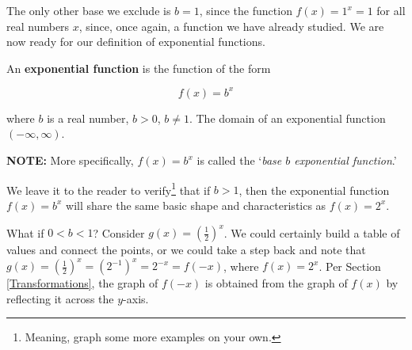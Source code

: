 \documentclass{ximera}
\begin{document}
The only other base we exclude is $b=1$, since the function $f(x) = 1^{x} = 1$ for all real numbers $x$, since, once again, a function we have already studied.  We are now ready for our definition of exponential functions.

\smallskip


\colorbox{ResultColor}{\bbm  

\begin{defn} \label{expfcndefn}    An \textbf{exponential function} is the function of the form


\[ f(x) = b^{x}\]

 where $b$ is a  real number, $b > 0$, $b \neq 1$.   The domain of an exponential function  $(-\infty, \infty)$.
 
 \textbf{NOTE:}  More specifically, $f(x) = b^{x}$ is called the `\textit{base $b$ exponential function}.'
\end{defn}


\ebm}

\smallskip

We leave it to the reader to verify\footnote{Meaning, graph some more examples on your own.} that if $b > 1$, then the exponential function $f(x) = b^{x}$ will share the same basic shape and characteristics as $f(x) = 2^{x}$.  

\smallskip

What if $0 < b < 1$?  Consider $g(x) = \left(\frac{1}{2}\right)^{x}$.  We could certainly build a table of values and connect the points, or we could take a step back and note that $g(x) = \left(\frac{1}{2}\right)^{x} = \left(2^{-1}\right)^{x} = 2^{-x} = f(-x)$, where $f(x) = 2^{x}$.  Per Section \ref{Transformations}, the graph of $f(-x)$ is obtained from the graph of $f(x)$ by reflecting it across the $y$-axis. 
\end{document}
